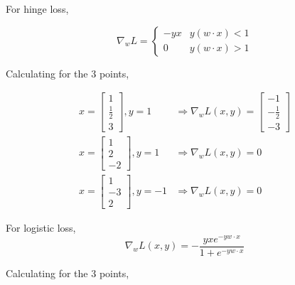 \begin{solution}
  For hinge loss,

  \[
    \nabla_w L = 
      \begin{cases}
        -y x & y(w\cdot x) < 1\\
        0 & y(w \cdot x) > 1
      \end{cases}
  \]

  Calculating for the 3 points,

  \begin{align*}
    x =
      \begin{bmatrix}
        1 \\ \frac{1}{2} \\ 3
      \end{bmatrix},
    y = 1
    &\Rightarrow
    \nabla_w L(x,y) =
      \begin{bmatrix}
        -1 \\ -\frac{1}{2} \\ -3
      \end{bmatrix}\\
    x =
      \begin{bmatrix}
        1 \\ 2 \\ -2
      \end{bmatrix},
    y = 1
    &\Rightarrow
    \nabla_w L(x,y) =
      0\\
    x =
      \begin{bmatrix}
        1 \\-3 \\ 2
      \end{bmatrix},
    y = -1
    &\Rightarrow
    \nabla_w L(x,y) =
      0
  \end{align*}

  For logistic loss,
  \[
    \nabla_w L(x,y) = - \frac{y x e^{-y w \cdot x}}{1 + e^{-y w \cdot x}}
  \]

  Calculating for the 3 points,


\end{solution}
